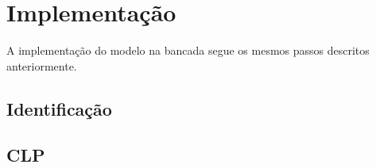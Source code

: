 %

\chapter{Implementação} \label{capImp}

A implementação do modelo na bancada segue os mesmos passos descritos anteriormente.

\section{Identificação}

\section{CLP}

%

